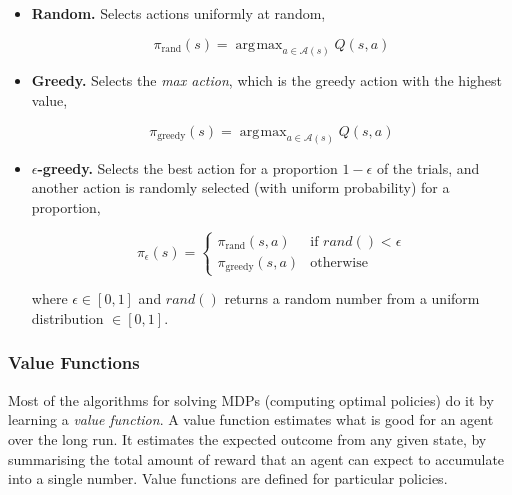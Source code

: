 \documentclass{article}
\DeclareMathOperator*{\argmax}{\arg\!\max}
\begin{document}
\begin{itemize}

    \item \textbf{Random.} Selects actions uniformly at random,

        \begin{equation}
            \pi_{\textrm{rand}}(s) = \argmax_{a \in \mathcal{A}(s)} Q(s, a)
        \end{equation}

    \item \textbf{Greedy.} Selects the \emph{max action}, which is the greedy
                           action with the highest value,

        \begin{equation}
            \pi_{\textrm{greedy}}(s) = \argmax_{a \in \mathcal{A}(s)} Q(s, a)
        \end{equation}

    \item \textbf{$\epsilon$-greedy.} Selects the best action for a proportion
        $1 - \epsilon$ of the trials, and another action is randomly selected (with
        uniform probability) for a proportion,

        \begin{equation}
            \pi_{\epsilon}(s) = \left\{
             \begin{array}{lr}
                 \pi_{\textrm{rand}}(s,a) & \text{if } rand() < \epsilon\\
                 \pi_{\textrm{greedy}}(s,a) & \text{otherwise}
             \end{array}
           \right.
        \end{equation}

        where $\epsilon \in [0, 1]$ and $rand()$ returns a random number from a
        uniform distribution $\in [0, 1]$.

\end{itemize}

\subsubsection{Value Functions}

Most of the algorithms for solving MDPs (computing optimal policies) do it by learning a \emph{value
function}. A value function estimates what is good for an agent over the long run. It estimates the
expected outcome from any given state, by summarising the total amount of reward that an agent can
expect to accumulate into a single number. Value functions are defined for particular policies.
\end{document}

